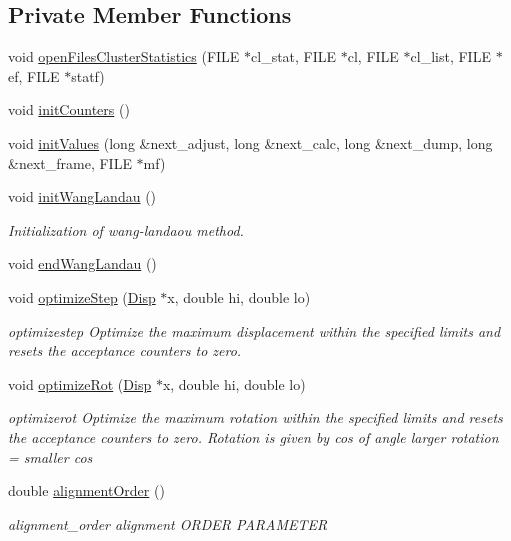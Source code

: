 \subsection*{Private Member Functions}
\begin{DoxyCompactItemize}
\item 
void \hyperlink{class_updater_acccf7211cd6f50fa2e6204f9a722c507}{open\+Files\+Cluster\+Statistics} (F\+I\+L\+E $\ast$cl\+\_\+stat, F\+I\+L\+E $\ast$cl, F\+I\+L\+E $\ast$cl\+\_\+list, F\+I\+L\+E $\ast$ef, F\+I\+L\+E $\ast$statf)
\item 
void \hyperlink{class_updater_a2560d47361a5335afc86a4bae94f96ec}{init\+Counters} ()
\item 
void \hyperlink{class_updater_a6739aba7e721e7a49f60a5513f6ba32c}{init\+Values} (long \&next\+\_\+adjust, long \&next\+\_\+calc, long \&next\+\_\+dump, long \&next\+\_\+frame, F\+I\+L\+E $\ast$mf)
\item 
void \hyperlink{class_updater_a76445be97c06ecf75daa9bdf01f4799d}{init\+Wang\+Landau} ()
\begin{DoxyCompactList}\small\item\em Initialization of wang-\/landaou method. \end{DoxyCompactList}\item 
void \hyperlink{class_updater_ad430c652adde7c1b42f5a928da48c64c}{end\+Wang\+Landau} ()
\item 
void \hyperlink{class_updater_af25a87eb3106bf56c480aadaddf01204}{optimize\+Step} (\hyperlink{struct_disp}{Disp} $\ast$x, double hi, double lo)
\begin{DoxyCompactList}\small\item\em optimizestep Optimize the maximum displacement within the specified limits and resets the acceptance counters to zero. \end{DoxyCompactList}\item 
void \hyperlink{class_updater_ad338fbf16ab7c900490a94321fe865f3}{optimize\+Rot} (\hyperlink{struct_disp}{Disp} $\ast$x, double hi, double lo)
\begin{DoxyCompactList}\small\item\em optimizerot Optimize the maximum rotation within the specified limits and resets the acceptance counters to zero. Rotation is given by cos of angle larger rotation = smaller cos \end{DoxyCompactList}\item 
double \hyperlink{class_updater_ac2c6869c4c7dd8d977e83997fb6ab345}{alignment\+Order} ()
\begin{DoxyCompactList}\small\item\em alignment\+\_\+order alignment O\+R\+D\+E\+R P\+A\+R\+A\+M\+E\+T\+E\+R \end{DoxyCompactList}\item 

\end{DoxyCompactItemize}
